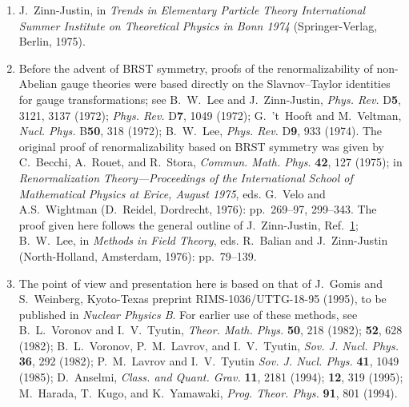 


\begin{enumerate}
  \item {}\label{ch17-ref-1}
  J.~Zinn-Justin, in \textit{Trends in Elementary Particle Theory International Summer Institute on Theoretical Physics in Bonn 1974} (Springer-Verlag, Berlin, 1975).

  \item {}\label{ch17-ref-2}
  Before the advent of BRST symmetry, proofs of the renormalizability of non-Abelian gauge theories were based directly on the Slavnov--Taylor identities for gauge transformations; see B.~W.~Lee and J.~Zinn-Justin, \textit{Phys. Rev.} D\textbf{5}, 3121, 3137 (1972); \textit{Phys. Rev.} D\textbf{7}, 1049 (1972); G.~'t~Hooft and M.~Veltman, \textit{Nucl. Phys.} B\textbf{50}, 318 (1972); B.~W.~Lee, \textit{Phys. Rev.} D\textbf{9}, 933 (1974). The original proof of renormalizability based on BRST symmetry was given by C.~Becchi, A.~Rouet, and R.~Stora, \textit{Commun. Math. Phys.} \textbf{42}, 127 (1975); in \textit{Renormalization Theory---Proceedings of the International School of Mathematical Physics at Erice, August 1975}, eds. G.~Velo and A.S.~Wightman (D.~Reidel, Dordrecht, 1976): pp.~269--97, 299--343. The proof given here follows the general outline of J.~Zinn-Justin, Ref.~\hyperref[ch17-ref-1]{1}; B.~W.~Lee, in \textit{Methods in Field Theory}, eds. R.~Balian and J.~Zinn-Justin (North-Holland, Amsterdam, 1976): pp.~79--139.

  \item {}\label{ch17-ref-3}
  The point of view and presentation here is based on that of J.~Gomis and S.~Weinberg, Kyoto-Texas preprint RIMS-1036/UTTG-18-95 (1995), to be published in \textit{Nuclear Physics B}. For earlier use of these methods, see B.~L.~Voronov and I.~V.~Tyutin, \textit{Theor. Math. Phys.} \textbf{50}, 218 (1982); \textbf{52}, 628 (1982); B.~L.~Voronov, P.~M.~Lavrov, and I.~V.~Tyutin, \textit{Sov. J. Nucl. Phys.} \textbf{36}, 292 (1982); P.~M.~Lavrov and I.~V.~Tyutin \textit{Sov. J. Nucl. Phys.} \textbf{41}, 1049 (1985); D.~Anselmi, \textit{Class. and Quant. Grav.} \textbf{11}, 2181 (1994); \textbf{12}, 319 (1995); M.~Harada, T.~Kugo, and K.~Yamawaki, \textit{Prog. Theor. Phys.} \textbf{91}, 801 (1994).


\end{enumerate}
